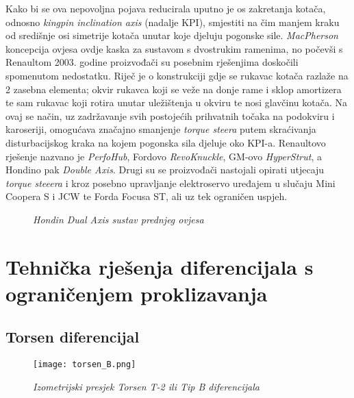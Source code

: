 \documentclass[11pt]{article}
\numberwithin{equation}{section}%
\begin{document}
Kako bi se ova nepovoljna pojava reducirala uputno je os zakretanja kotača, odnosno \textit{kingpin inclination axis} (nadalje KPI), smjestiti na čim manjem kraku od središnje osi simetrije kotača unutar koje djeluju pogonske sile. \textit{MacPherson} koncepcija ovjesa ovdje kaska za sustavom s dvostrukim ramenima, no počevši s Renaultom 2003. godine proizvođači su posebnim rješenjima doskočili spomenutom nedostatku. Riječ je o konstrukciji gdje se rukavac kotača razlaže na 2 zasebna elementa; okvir rukavca koji se veže na donje rame i sklop amortizera te sam rukavac koji rotira unutar uležištenja u okviru te nosi glavčinu kotača. Na ovaj se način, uz zadržavanje svih postojećih prihvatnih točaka na podokviru i karoseriji, omogućava značajno smanjenje \textit{torque steera} putem skraćivanja disturbacijskog kraka na kojem pogonska sila djeluje oko KPI-a. Renaultovo rješenje nazvano je \textit{PerfoHub}, Fordovo \textit{RevoKnuckle}, GM-ovo \textit{HyperStrut}, a Hondino pak \textit{Double Axis}. Drugi su se proizvođači nastojali opirati utjecaju \textit{torque steeera} i kroz posebno upravljanje elektroservo uređajem u slučaju Mini Coopera S i JCW te Forda Focusa ST, ali uz tek ograničen uspjeh.

\begin{figure}
 \centering
 \def\svgwidth{14cm}
 
 \caption{\textit{Hondin Dual Axis sustav prednjeg ovjesa} \cite{Honda}}
 \label{fig:dual}
\end{figure} 


 
\newpage
\section{Tehnička rješenja diferencijala s ograničenjem proklizavanja}
	\subsection{Torsen diferencijal}

\begin{wrapfigure}{r}{0.4\textwidth}
\centering
    \texttt{[image: torsen\_B.png]}
    \caption{\textit{Izometrijski presjek Torsen T-2 ili Tip B diferencijala} \cite{2023basiclars}}
    \label{fig:torsen_B}
\end{wrapfigure}
\end{document}

